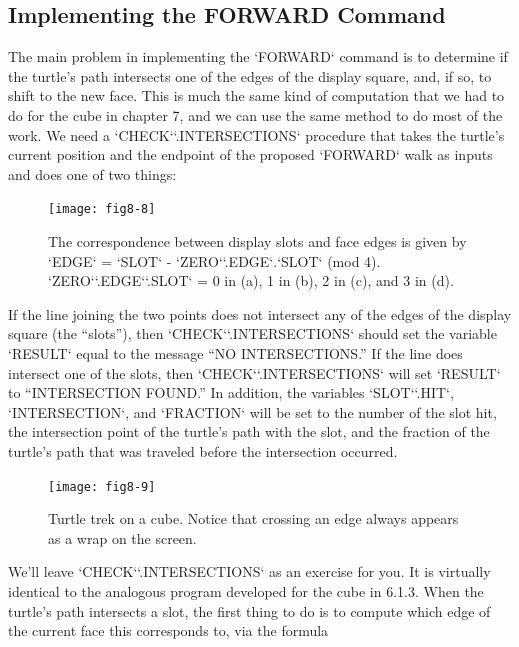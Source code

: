 \documentclass{book}
\begin{document}
\subsection{Implementing the FORWARD Command}

The main problem in implementing the \textsc{`FORWARD`} command is to determine if the turtle's path intersects one of the edges of the display square,
and, if so, to shift to the new face. This is much the same kind of computation that we had to do for the cube in chapter 7, and we can use the
same method to do most of the work. We need a \textsc{`CHECK`}\textsc{`.INTERSECTIONS`}
procedure that takes the turtle's current position and the endpoint of
the proposed \textsc{`FORWARD`} walk as inputs and does one of two things:

\begin{figure}
\begin{center}
\texttt{[image: fig8-8]}
\caption{The correspondence between display slots and face edges is given by \textsc{`EDGE`} = \textsc{`SLOT`} - \textsc{`ZERO`}\textsc{`.EDGE`}.\textsc{`SLOT`} (mod 4). \textsc{`ZERO`}\textsc{`.EDGE`}\textsc{`.SLOT`} = 0 in (a), 1 in (b), 2 in (c), and 3 in (d).}
\end{center}
\end{figure}

If the line joining the two points does not intersect any of the edges of
the display square (the ``slots''), then \textsc{`CHECK`}\textsc{`.INTERSECTIONS`} should set
the variable \textsc{`RESULT`} equal to the message ``NO INTERSECTIONS.''
If the line does intersect one of the slots, then \textsc{`CHECK`}\textsc{`.INTERSECTIONS`}
will set \textsc{`RESULT`} to ``INTERSECTION FOUND.'' In addition, the variables
\textsc{`SLOT`}\textsc{`.HIT`}, \textsc{`INTERSECTION`}, and \textsc{`FRACTION`} will be set to the number of
the slot hit, the intersection point of the turtle's path with the slot, and
the fraction of the turtle's path that was traveled before the intersection
occurred.

\begin{figure}
\begin{center}
\texttt{[image: fig8-9]}
\caption{Turtle trek on a cube. Notice that crossing an edge always appears as a wrap on the screen.}
\end{center}
\end{figure}

We'll leave \textsc{`CHECK`}\textsc{`.INTERSECTIONS`} as an exercise for you. It is virtually
identical to the analogous program developed for the cube in 6.1.3.
When the turtle's path intersects a slot, the first thing to do is to
compute which edge of the current face this corresponds to, via the
formula
\end{document}

